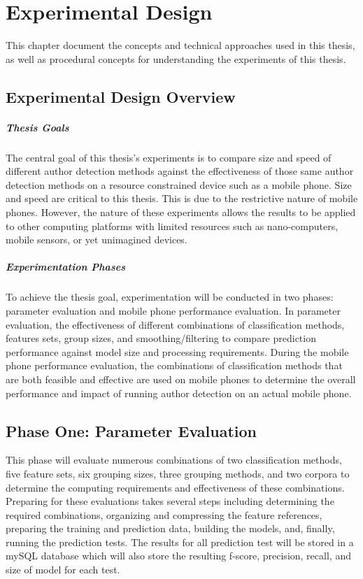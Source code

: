 \chapter{Experimental Design}
This chapter document the concepts and technical approaches used in this thesis, as well as procedural concepts for understanding the experiments of this thesis.

\section{Experimental Design Overview}
	\paragraph{Thesis Goals} The central goal of this thesis's experiments is to compare size and speed of different author detection methods against the effectiveness of those same author detection methods on a resource constrained device such as a mobile phone.  Size and speed are critical to this thesis. This is due to the restrictive nature of mobile phones.  However, the nature of these experiments allows the results to be applied to other computing platforms with limited resources such as nano-computers, mobile sensors, or yet unimagined devices.
	\paragraph{Experimentation Phases}To achieve the thesis goal, experimentation will be conducted in two phases: parameter evaluation and mobile phone performance evaluation.  In parameter evaluation, the effectiveness of different combinations of classification methods, features sets, group sizes, and smoothing/filtering to compare prediction performance against model size and processing requirements.  During the mobile phone performance evaluation, the combinations of classification methods that are both feasible and effective are used on mobile phones to determine the overall performance and impact of running author detection on an actual mobile phone.

\section{Phase One: Parameter Evaluation} This phase will evaluate numerous combinations of two classification methods, five feature sets, six grouping sizes, three grouping methods, and two corpora to determine the computing requirements and effectiveness of these combinations.  Preparing for these evaluations takes several steps including determining the required combinations, organizing and compressing the feature references, preparing the training and prediction data, building the models, and, finally, running the prediction tests.  The results for all prediction test will be stored in a mySQL database which will also store the resulting f-score, precision, recall, and size of model for each test.

